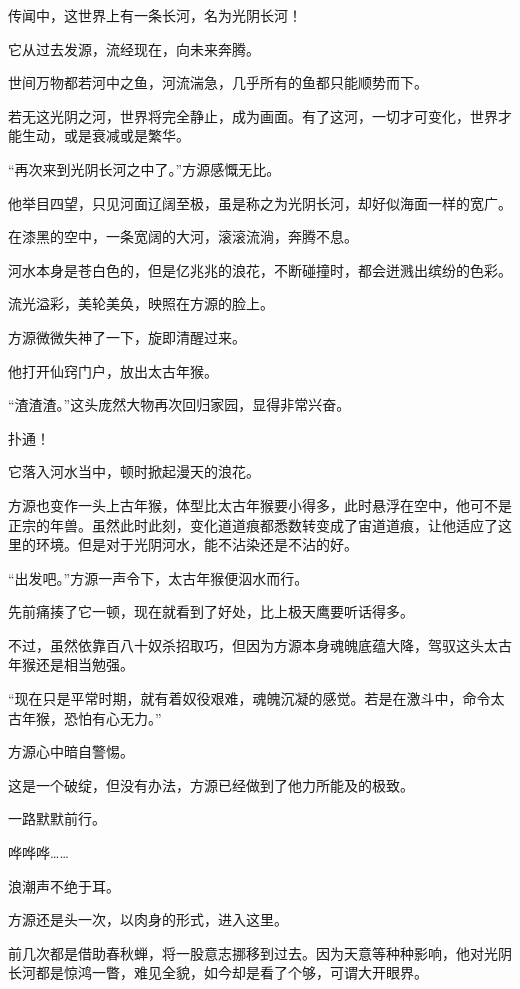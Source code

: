 
\begin{this_body}

传闻中，这世界上有一条长河，名为光阴长河！

它从过去发源，流经现在，向未来奔腾。

世间万物都若河中之鱼，河流湍急，几乎所有的鱼都只能顺势而下。

若无这光阴之河，世界将完全静止，成为画面。有了这河，一切才可变化，世界才能生动，或是衰减或是繁华。

“再次来到光阴长河之中了。”方源感慨无比。

他举目四望，只见河面辽阔至极，虽是称之为光阴长河，却好似海面一样的宽广。

在漆黑的空中，一条宽阔的大河，滚滚流淌，奔腾不息。

河水本身是苍白色的，但是亿兆兆的浪花，不断碰撞时，都会迸溅出缤纷的色彩。

流光溢彩，美轮美奂，映照在方源的脸上。

方源微微失神了一下，旋即清醒过来。

他打开仙窍门户，放出太古年猴。

“渣渣渣。”这头庞然大物再次回归家园，显得非常兴奋。

扑通！

它落入河水当中，顿时掀起漫天的浪花。

方源也变作一头上古年猴，体型比太古年猴要小得多，此时悬浮在空中，他可不是正宗的年兽。虽然此时此刻，变化道道痕都悉数转变成了宙道道痕，让他适应了这里的环境。但是对于光阴河水，能不沾染还是不沾的好。

“出发吧。”方源一声令下，太古年猴便泅水而行。

先前痛揍了它一顿，现在就看到了好处，比上极天鹰要听话得多。

不过，虽然依靠百八十奴杀招取巧，但因为方源本身魂魄底蕴大降，驾驭这头太古年猴还是相当勉强。

“现在只是平常时期，就有着奴役艰难，魂魄沉凝的感觉。若是在激斗中，命令太古年猴，恐怕有心无力。”

方源心中暗自警惕。

这是一个破绽，但没有办法，方源已经做到了他力所能及的极致。

一路默默前行。

哗哗哗……

浪潮声不绝于耳。

方源还是头一次，以肉身的形式，进入这里。

前几次都是借助春秋蝉，将一股意志挪移到过去。因为天意等种种影响，他对光阴长河都是惊鸿一瞥，难见全貌，如今却是看了个够，可谓大开眼界。


\end{this_body}
